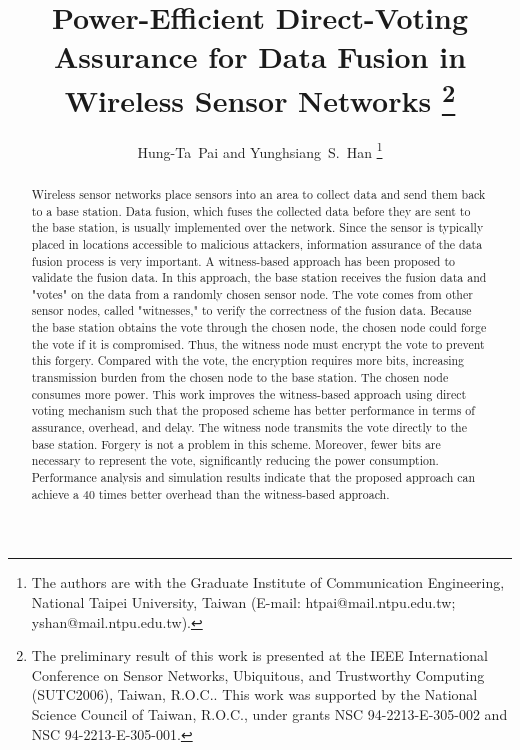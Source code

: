 \documentclass[12pt, onecolumn, draftcls]{IEEEtran}
\begin{document}
\title{Power-Efficient Direct-Voting  Assurance for Data Fusion in Wireless Sensor Networks
\thanks{The preliminary result of this work is presented at the
IEEE International Conference on Sensor Networks, Ubiquitous, and
Trustworthy Computing (SUTC2006), Taiwan, R.O.C.. This work was
supported by the National Science Council of Taiwan, R.O.C., under
grants NSC 94-2213-E-305-002 and NSC 94-2213-E-305-001.}}

\author{Hung-Ta~Pai and Yunghsiang~S.~Han \thanks{The authors are
with the Graduate Institute of Communication Engineering, National
Taipei University, Taiwan (E-mail: htpai@mail.ntpu.edu.tw;
yshan@mail.ntpu.edu.tw).}}

\maketitle \thispagestyle{empty}

\setlength{\baselineskip}{24pt}
\begin{abstract}
\noindent Wireless sensor networks place sensors into an area to
collect data and send them back to a base station. Data fusion,
which fuses the collected data before they are sent to the base
station, is usually implemented over the network. Since the sensor
is typically placed in locations accessible to malicious attackers,
information assurance of the data fusion process is very important.
A witness-based approach has been proposed to validate the fusion
data. In this approach, the base station receives the fusion data
and "votes" on the data from a randomly chosen sensor node. The vote
comes from other sensor nodes, called "witnesses," to verify the
correctness of the fusion data. Because the base station obtains the
vote through the chosen node, the chosen node could forge the vote
if it is compromised. Thus, the witness node must encrypt the vote
to prevent this forgery. Compared with the vote, the encryption
requires more bits, increasing transmission burden from the chosen
node to the base station. The chosen node consumes more power. This
work improves the witness-based approach using direct voting
mechanism such that the proposed scheme has better performance in
terms of assurance, overhead, and delay. The witness node transmits
the vote directly to the base station. Forgery is not a problem in
this scheme. Moreover, fewer bits are necessary to represent the
vote, significantly reducing the power consumption. Performance
analysis and simulation results indicate that the proposed approach
can achieve a $40$ times better overhead than the witness-based
approach.
\end{abstract}
\end{document}
